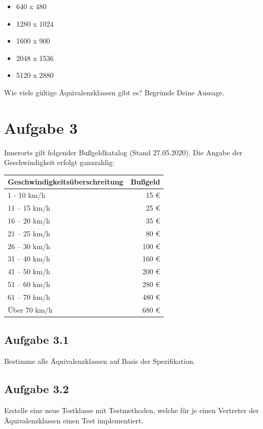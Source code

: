 \begin{itemize}
  \item 640 x 480
  \item 1280 x 1024
  \item 1600 x 900
  \item 2048 x 1536
  \item 5120 x 2880
\end{itemize}

Wie viele gültige Äquivalenzklassen gibt es? Begründe Deine Aussage.

\newpage
\section*{Aufgabe 3}
Innerorts gilt folgender Bußgeldkatalog (Stand 27.05.2020). Die Angabe der Geschwindigkeit erfolgt ganzzahlig:

\vspace{.3cm}

\begin{center}
\begin{tabular}{|l|r|}
\hline
\textbf{Geschwindigkeitsüberschreitung} & \textbf{Bußgeld} \\ \hline\hline
1 - 10 km/h                      & 15 €    \\ \hline
11 – 15 km/h 	                 & 25 €	   \\ \hline
16 – 20 km/h 	                 & 35 €	   \\ \hline
21 – 25 km/h 	                 & 80 €	   \\ \hline
26 – 30 km/h 	                 & 100 €   \\ \hline
31 – 40 km/h 	                 & 160 €   \\ \hline
41 – 50 km/h 	                 & 200 €   \\ \hline
51 – 60 km/h 	                 & 280 €   \\ \hline
61 – 70 km/h 	                 & 480 €   \\ \hline
Über 70 km/h 	                 & 680 €   \\ \hline
\end{tabular}
\end{center}

\subsection*{Aufgabe 3.1}
Bestimme alle Äquivalenzklassen auf Basis der Spezifikation.

\subsection*{Aufgabe 3.2}
Erstelle eine neue Testklasse mit Testmethoden, welche für je einen Vertreter der Äquivalenzklassen einen Test implementiert.


